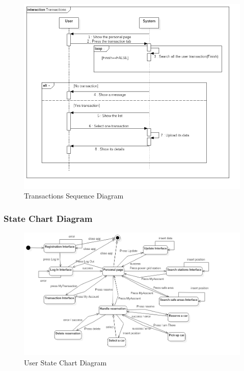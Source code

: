 \vspace{10pt}
\begin{figure}[htbp]
\centering
\includegraphics[width=\textwidth]{Images/UML/Transactions}
\caption{Transactions Sequence Diagram}
\label{fig:transseq}
\end{figure}
\clearpage

\subsubsection{State Chart Diagram}

\vspace{10pt}
\begin{figure}[htbp]
\centering
\includegraphics[width=\textwidth]{Images/UML/Statechart}
\caption{User State Chart Diagram}
\label{fig:chart}
\end{figure}
\clearpage






